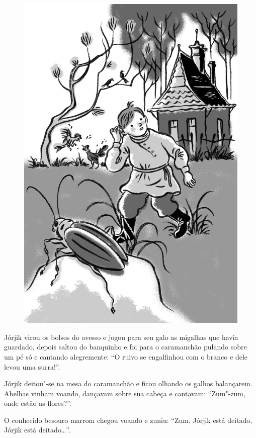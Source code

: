 \begin{figure}%
\vspace*{-2.4cm}
\hspace*{-2.7cm}\includegraphics{./imgs/cena14.jpg}
\end{figure}


Jórjik virou os bolsos do avesso e jogou para seu galo as migalhas que
havia guardado, depois saltou do banquinho e foi para o caramanchão pulando sobre um pé só e cantando alegremente: ``O ruivo se
engalfinhou com o branco e dele levou uma surra!''.

Jórjik deitou"-se na mesa do caramanchão e ficou olhando os galhos
balançarem. Abelhas vinham voando, dançavam sobre sua cabeça e cantavam:
``Zum"-zum, onde estão as flores?''.

O conhecido besouro marrom chegou voando e zuniu: ``Zum, Jórjik está
deitado, Jórjik está deitado\ldots{}''.

